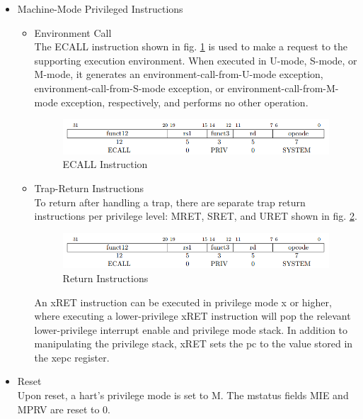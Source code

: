 \documentclass[../main.tex]{subfiles}
\begin{document}
\begin{itemize}
    \item[2- ]Machine-Mode Privileged Instructions
        \begin{itemize}
            \item Environment Call\\
            The ECALL instruction shown in fig. \ref{fig:ecall} is used to make a request to the supporting execution environment. When executed in U-mode, S-mode, or M-mode, it generates an environment-call-from-U-mode exception, environment-call-from-S-mode exception, or environment-call-from-M-mode exception, respectively, and performs no other operation.\\
            \begin{figure}[h!]
            \centering
            \includegraphics[width=10 cm]{diagrams/ecall.png}
            \caption{ECALL Instruction}
            \label{fig:ecall}
            \end{figure}
            
            \item Trap-Return Instructions\\
            To return after handling a trap, there are separate trap return instructions per privilege level: MRET, SRET, and URET shown in fig. \ref{fig:ret}.\\
            \begin{figure}[h!]
            \centering
            \includegraphics[width=10 cm]{diagrams/ecall.png}
            \caption{Return Instructions}
            \label{fig:ret}
            \end{figure}An xRET instruction can be executed in privilege mode x or higher, where executing a lower-privilege xRET instruction will pop the relevant lower-privilege interrupt enable and privilege mode stack. In addition to manipulating the privilege stack, xRET sets the pc to the value stored in the xepc register.
        \end{itemize}
    \item[3- ]Reset\\
    Upon reset, a hart’s privilege mode is set to M. The mstatus fields MIE and MPRV are reset to 0.
\end{itemize}
\end{document}
